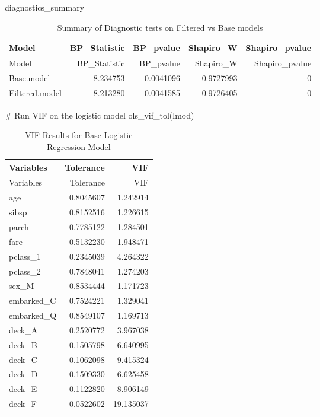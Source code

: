 \documentclass[
  letterpaper,
  DIV=11,
  numbers=noendperiod]{scrartcl}
\newenvironment{Shaded}{\begin{snugshade}}{\end{snugshade}}
\newcommand{\CommentTok}[1]{\textcolor[rgb]{0.37,0.37,0.37}{#1}}
\newcommand{\FunctionTok}[1]{\textcolor[rgb]{0.28,0.35,0.67}{#1}}
\newcommand{\NormalTok}[1]{\textcolor[rgb]{0.00,0.23,0.31}{#1}}
\begin{document}
\begin{Shaded}
\begin{Highlighting}[]
\NormalTok{diagnostics\_summary}
\end{Highlighting}
\end{Shaded}

\begin{longtable}[]{@{}lrrrr@{}}
\caption{Summary of Diagnostic tests on Filtered vs Base
models}\tabularnewline
\toprule\noalign{}
Model & BP\_Statistic & BP\_pvalue & Shapiro\_W & Shapiro\_pvalue \\
\midrule\noalign{}
\endfirsthead
\toprule\noalign{}
Model & BP\_Statistic & BP\_pvalue & Shapiro\_W & Shapiro\_pvalue \\
\midrule\noalign{}
\endhead
\bottomrule\noalign{}
\endlastfoot
Base.model & 8.234753 & 0.0041096 & 0.9727993 & 0 \\
Filtered.model & 8.213280 & 0.0041585 & 0.9726405 & 0 \\
\end{longtable}

\begin{Shaded}
\begin{Highlighting}[]
\CommentTok{\# Run VIF on the logistic model}
\FunctionTok{ols\_vif\_tol}\NormalTok{(lmod)}
\end{Highlighting}
\end{Shaded}

\begin{longtable}[]{@{}lrr@{}}
\caption{VIF Results for Base Logistic Regression Model}\tabularnewline
\toprule\noalign{}
Variables & Tolerance & VIF \\
\midrule\noalign{}
\endfirsthead
\toprule\noalign{}
Variables & Tolerance & VIF \\
\midrule\noalign{}
\endhead
\bottomrule\noalign{}
\endlastfoot
age & 0.8045607 & 1.242914 \\
sibsp & 0.8152516 & 1.226615 \\
parch & 0.7785122 & 1.284501 \\
fare & 0.5132230 & 1.948471 \\
pclass\_1 & 0.2345039 & 4.264322 \\
pclass\_2 & 0.7848041 & 1.274203 \\
sex\_M & 0.8534444 & 1.171723 \\
embarked\_C & 0.7524221 & 1.329041 \\
embarked\_Q & 0.8549107 & 1.169713 \\
deck\_A & 0.2520772 & 3.967038 \\
deck\_B & 0.1505798 & 6.640995 \\
deck\_C & 0.1062098 & 9.415324 \\
deck\_D & 0.1509330 & 6.625458 \\
deck\_E & 0.1122820 & 8.906149 \\
deck\_F & 0.0522602 & 19.135037 \\
\end{longtable}
\end{document}
